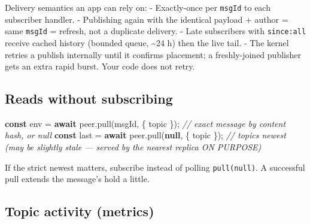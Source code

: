 \documentclass[
  nobib]{tufte-handout}
\newenvironment{Shaded}{}{}
\newcommand{\CommentTok}[1]{\textcolor[rgb]{0.38,0.63,0.69}{\textit{#1}}}
\newcommand{\ControlFlowTok}[1]{\textcolor[rgb]{0.00,0.44,0.13}{\textbf{#1}}}
\newcommand{\FunctionTok}[1]{\textcolor[rgb]{0.02,0.16,0.49}{#1}}
\newcommand{\KeywordTok}[1]{\textcolor[rgb]{0.00,0.44,0.13}{\textbf{#1}}}
\newcommand{\NormalTok}[1]{#1}
\newcommand{\OperatorTok}[1]{\textcolor[rgb]{0.40,0.40,0.40}{#1}}
\begin{document}
Delivery semantics an app can rely on: - Exactly-once per \texttt{msgId}
to each subscriber handler. - Publishing again with the identical
payload + author = same \texttt{msgId} = refresh, not a duplicate
delivery. - Late subscribers with
\texttt{since:\textquotesingle{}all\textquotesingle{}} receive cached
history (bounded queue, \textasciitilde24 h) then the live tail. - The
kernel retries a publish internally until it confirms placement; a
freshly-joined publisher gets an extra rapid burst. Your code does not
retry.

\subsection{Reads without subscribing}\label{reads-without-subscribing}

\begin{Shaded}
\begin{Highlighting}[]
\KeywordTok{const}\NormalTok{ env  }\OperatorTok{=} \ControlFlowTok{await}\NormalTok{ peer}\OperatorTok{.}\FunctionTok{pull}\NormalTok{(msgId}\OperatorTok{,}\NormalTok{ \{ topic \})}\OperatorTok{;}        \CommentTok{// exact message by content hash, or null}
\KeywordTok{const}\NormalTok{ last }\OperatorTok{=} \ControlFlowTok{await}\NormalTok{ peer}\OperatorTok{.}\FunctionTok{pull}\NormalTok{(}\KeywordTok{null}\OperatorTok{,}\NormalTok{  \{ topic \})}\OperatorTok{;}        \CommentTok{// topic\textquotesingle{}s newest (may be slightly stale — served by the nearest replica ON PURPOSE)}
\end{Highlighting}
\end{Shaded}

If the strict newest matters, subscribe instead of polling
\texttt{pull(null)}. A successful pull extends the message's hold a
little.

\subsection{Topic activity (metrics)}\label{topic-activity-metrics}
\end{document}
